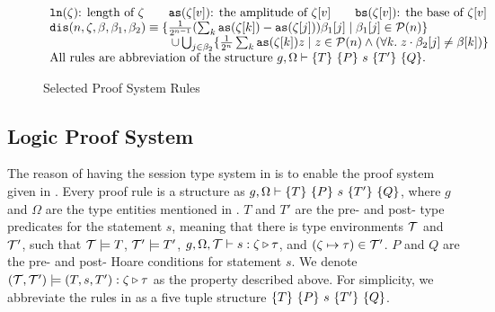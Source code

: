 \begin{figure*}[t]
{\begin{mathpar}


  \end{mathpar}
}
{\footnotesize
\[
\begin{array}{l}
\texttt{ln}(\zeta)\text{: length of }\zeta
\qquad
\texttt{as}(\zeta[v])\text{: the amplitude of }\zeta[v]
\qquad
\texttt{bs}(\zeta[v])\text{: the base of }\zeta[v]
\\
\texttt{dis}(n,\zeta,\beta,\beta_1,\beta_2)\equiv \{\frac{1}{2^{n-1}}(\sum_k \texttt{as}(\zeta[k])-\texttt{as}(\zeta[j]))\beta_1[j]
                           \;|\; \beta_1[j]\in \tpower{n} \}
\\
\qquad\qquad\qquad\qquad\qquad
\cup  \bigcup_{j\in \beta_2}\{\frac{1}{2^{n}}\sum_k \texttt{as}(\zeta[k])z
                           \;|\; z\in \tpower{n} \wedge (\forall k.\;z \cdot \beta_2[j] \neq \beta[k]) \}

\\
\text{All rules are abbreviation of the structure }g,\Omega\vdash \fivepule{T}{P}{s}{T'}{Q}.
\end{array}
\]
}
\caption{Selected Proof System Rules}
\label{fig:exp-proofsystem}
\end{figure*}

\subsection{Logic Proof System}\label{sec:logical}


The reason of having the session type system in 
is to enable the proof system given in .
Every proof rule is a structure as $g,\Omega\vdash \fivepule{T}{P}{s}{T'}{Q}$,
where $g$ and $\Omega$ are the type entities mentioned in .
$T$ and $T'$ are the pre- and post- type predicates for the statement $s$, 
meaning that there is type environments $\itau$ and $\itau'$, such that $\itau\models T$,
$\itau'\models T'$, $g,\Omega,\itau \vdash s : \zeta\triangleright \tau$, and $(\zeta\mapsto \tau) \in \itau'$.
$P$ and $Q$ are the pre- and post- Hoare conditions for statement $s$.
We denote $(\itau,\itau')\models (T,s,T'):\zeta\triangleright\tau$ as the property described above.
For simplicity, we abbreviate the rules in  as a five tuple structure $\fivepule{T}{P}{s}{T'}{Q}$.

